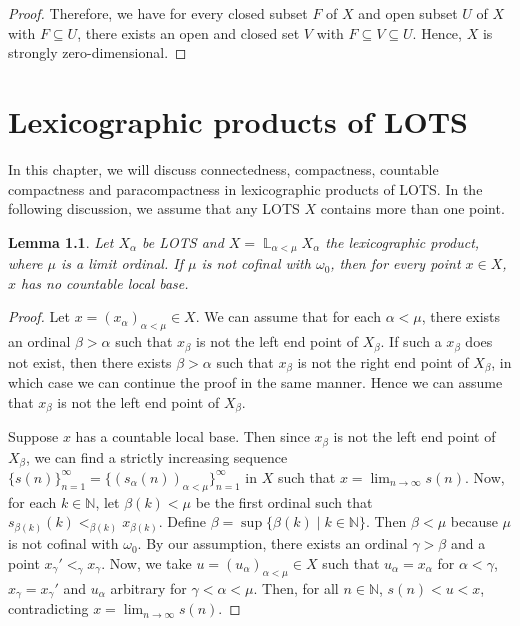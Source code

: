 \documentclass[12pt,oneside,english]{amsbook}
\numberwithin{equation}{section} %
\numberwithin{figure}{section} %
\theoremstyle{plain}
\numberwithin{section}{chapter}
\theoremstyle{plain}
\newtheorem{lem}[thm]{Lemma}
\DeclareMathOperator{\LP}{\mathbb{L}}
\begin{document}
\begin{proof}
  Therefore, we have for every closed subset $F$ of $X$ and open subset $U$ of $X$ with $F \subseteq U$, there exists an open and closed set $V$ with $F \subseteq V \subseteq U$. Hence, $X$ is strongly zero-dimensional. 
\end{proof}


\chapter{Lexicographic products of LOTS}
In this chapter, we will discuss connectedness, compactness, countable compactness and paracompactness in lexicographic products of LOTS. In the following discussion, we assume that any LOTS $X$ contains more than one point.
\begin{lem}
  Let $X_{\alpha}$ be LOTS and $X = \LP_{\alpha < \mu} X_{\alpha}$ the lexicographic product, where $\mu$ is a limit ordinal. If $\mu$ is not cofinal with $\omega_{0}$, then for every point $x \in X$, $x$ has no countable local base.
\end{lem}
\begin{proof}
  Let $x = (x_{\alpha})_{\alpha < \mu} \in X$. We can assume that for each $\alpha < \mu$, there exists an ordinal $\beta > \alpha$ such that $x_{\beta}$ is not the left end point of $X_{\beta}$. If such a $x_{\beta}$ does not exist, then there exists $\beta > \alpha$ such that $x_{\beta}$ is not the right end point of $X_{\beta}$, in which case we can continue the proof in the same manner. Hence we can assume that $x_{\beta}$ is not the left end point of $X_{\beta}$.

  Suppose $x$ has a countable local base. Then since $x_{\beta}$ is not the left end point of $X_{\beta}$, we can find a strictly increasing sequence $\{s(n)\}_{n = 1}^{\infty} = \{(s_{\alpha}(n))_{\alpha < \mu}\}_{n = 1}^{\infty}$ in $X$ such that $x = \lim_{n \to \infty}{s(n)}$. Now, for each $k \in \mathbb{N}$, let $\beta(k) < \mu$ be the first ordinal such that $s_{\beta(k)}(k) <_{\beta(k)} x_{\beta(k)}$. Define $\beta = \sup{\{\beta(k) \; | \; k \in \mathbb{N}\}}$. Then $\beta < \mu$ because $\mu$ is not cofinal with $\omega_{0}$. By our assumption, there exists an ordinal $\gamma > \beta$ and a point $x_{\gamma}' <_{\gamma} x_{\gamma}$. Now, we take $u = (u_{\alpha})_{\alpha < \mu} \in X$ such that $u_{\alpha} = x_{\alpha}$ for $\alpha < \gamma$, $x_{\gamma} = x_{\gamma}'$ and $u_{\alpha}$ arbitrary for $\gamma < \alpha < \mu$. Then, for all $n \in \mathbb{N}$, $s(n) < u < x$, contradicting  $x = \lim_{n \to \infty}{s(n)}$.    
\end{proof}
\end{document}
